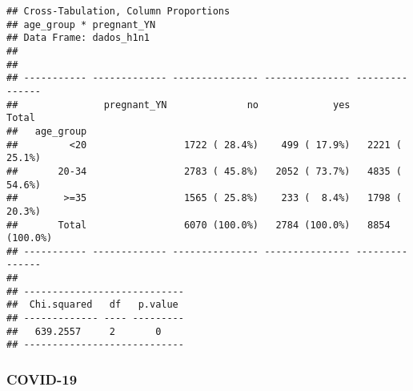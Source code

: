 \documentclass[
]{article}
\newenvironment{Shaded}{\begin{snugshade}}{\end{snugshade}}
\newcommand{\CommentTok}[1]{\textcolor[rgb]{0.56,0.35,0.01}{\textit{#1}}}
\newcommand{\DataTypeTok}[1]{\textcolor[rgb]{0.13,0.29,0.53}{#1}}
\newcommand{\DecValTok}[1]{\textcolor[rgb]{0.00,0.00,0.81}{#1}}
\newcommand{\KeywordTok}[1]{\textcolor[rgb]{0.13,0.29,0.53}{\textbf{#1}}}
\newcommand{\NormalTok}[1]{#1}
\newcommand{\OperatorTok}[1]{\textcolor[rgb]{0.81,0.36,0.00}{\textbf{#1}}}
\newcommand{\OtherTok}[1]{\textcolor[rgb]{0.56,0.35,0.01}{#1}}
\newcommand{\StringTok}[1]{\textcolor[rgb]{0.31,0.60,0.02}{#1}}
\begin{document}
\begin{verbatim}
## Cross-Tabulation, Column Proportions  
## age_group * pregnant_YN  
## Data Frame: dados_h1n1  
## 
## 
## ----------- ------------- --------------- --------------- ---------------
##               pregnant_YN              no             yes           Total
##   age_group                                                              
##         <20                 1722 ( 28.4%)    499 ( 17.9%)   2221 ( 25.1%)
##       20-34                 2783 ( 45.8%)   2052 ( 73.7%)   4835 ( 54.6%)
##        >=35                 1565 ( 25.8%)    233 (  8.4%)   1798 ( 20.3%)
##       Total                 6070 (100.0%)   2784 (100.0%)   8854 (100.0%)
## ----------- ------------- --------------- --------------- ---------------
## 
## ----------------------------
##  Chi.squared   df   p.value 
## ------------- ---- ---------
##   639.2557     2       0    
## ----------------------------
\end{verbatim}

\hypertarget{covid-19-1}{%
\subsubsection{COVID-19}\label{covid-19-1}}

\begin{Shaded}
\end{Shaded}
\end{document}
